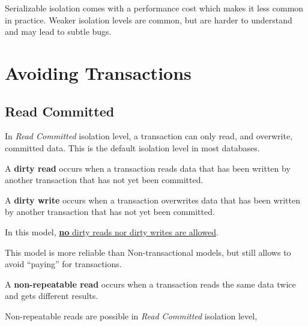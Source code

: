 Serializable isolation comes with a performance cost which makes it less common in practice.
Weaker isolation levels are common, but are harder to understand and may lead to subtle bugs.

\section{Avoiding Transactions}
\subsection{Read Committed}
In \textit{Read Committed} isolation level, a transaction can only read, and overwrite, committed data.
This is the default isolation level in most databases.

\begin{definition}
   A \textbf{dirty read} occurs when a transaction reads data that has been written by another transaction that has not yet been committed.
\end{definition}


\begin{definition}
   A \textbf{dirty write} occurs when a transaction overwrites data that has been written by another transaction that has not yet been committed.
\end{definition}

In this model, \ul{\textbf{no} dirty reads nor dirty writes are allowed}.

This model is more reliable than Non-transactional models, but still allows to avoid ``paying'' for transactions.

\begin{definition}
   A \textbf{non-repeatable read} occurs when a transaction reads the same data twice and gets different results.
\end{definition}

Non-repeatable reads are possible in \textit{Read Committed} isolation level, 


